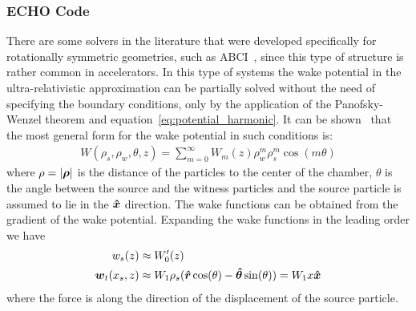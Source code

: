 \subsubsection{ECHO Code}

    There are some solvers in the literature that were developed specifically for rotationally symmetric geometries, such as ABCI~\cite{Chin1994a}, since this type of structure is rather common in accelerators. In this type of systems the wake potential in the ultra-relativistic approximation can be partially solved without the need of specifying the boundary conditions, only by the application of the Panofsky-Wenzel theorem and equation~\eqref{eq:potential_harmonic}. It can be shown~\cite{Stupakov2000a} that the most general form for the wake potential in such conditions is:
    \begin{align}
	       W(\rho_s, \rho_w, \theta, z) = \sum_{m=0}^\infty W_m(z) \rho_w^m\rho_s^m\cos(m\theta)
    \end{align}
    where $\rho = |\boldsymbol{\rho}|$ is the distance of the particles to the center of the chamber, $\theta$ is the angle between the source and the witness particles and the source particle is assumed to lie in the $\boldsymbol{\hat x}$ direction. The wake functions can be obtained from the gradient of the wake potential. Expanding the wake functions in the leading order we have
    \begin{align}
	    w_s(z) &\approx W'_0(z)\\
	    \boldsymbol{w}_t(x_s, z) &\approx W_1\rho_s(\boldsymbol{\hat r}\cos(\theta)-\boldsymbol{\hat\theta}\sin(\theta)) =
						W_1x\boldsymbol{\hat x}
    \end{align}
    where the force is along the direction of the displacement of the source particle.

